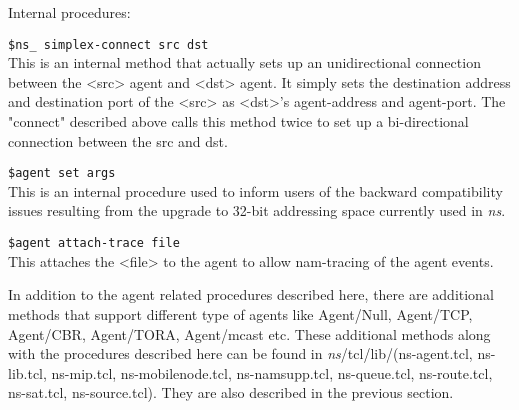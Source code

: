 \begin{flushleft}
Internal procedures:

{\tt \$ns\_ simplex-connect \<src\> \<dst\>}\\
This is an internal method that actually sets up an unidirectional connection
between the <src> agent and <dst> agent. It simply sets the destination address
and destination port of the <src> as <dst>'s agent-address and agent-port.
The "connect" described above calls this method twice to set up a bi-directional
connection between the src and dst.


{\tt \$agent set \<args\>}\\
This is an internal procedure used to inform users of the backward compatibility
issues resulting from the upgrade to 32-bit addressing space currently used
in \emph{ns}.

{\tt \$agent attach-trace \<file\>}\\
This attaches the <file> to the agent to allow nam-tracing of the agent
events.


In addition to the agent related procedures described here, there are additional
methods that support different type of agents like Agent/Null, Agent/TCP,
Agent/CBR, Agent/TORA, Agent/mcast etc. These additional methods along
with the procedures described here can be found in \emph{ns}/tcl/lib/(ns-agent.tcl,
ns-lib.tcl, ns-mip.tcl, ns-mobilenode.tcl, ns-namsupp.tcl, ns-queue.tcl,
ns-route.tcl, ns-sat.tcl, ns-source.tcl). They are also described in the
previous section.

\end{flushleft} 

\endinput
